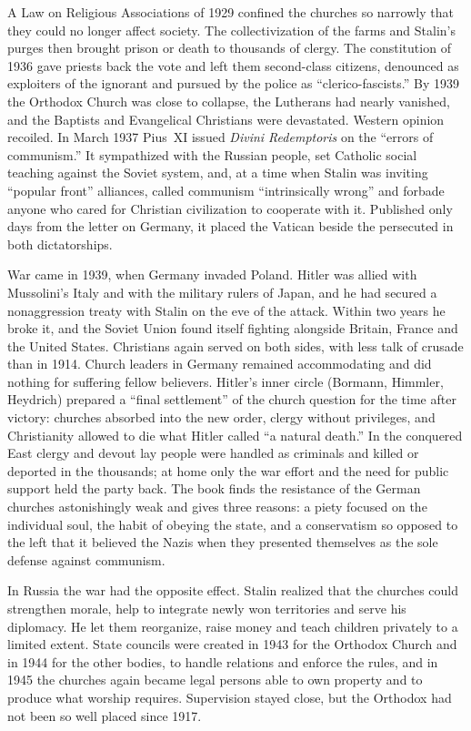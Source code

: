 A Law on Religious Associations of 1929 confined the churches so narrowly that they could no longer
affect society. The collectivization of the farms and Stalin's purges then brought prison or death to
thousands of clergy. The constitution of 1936 gave priests back the vote and left them second-class
citizens, denounced as exploiters of the ignorant and pursued by the police as ``clerico-fascists.''
By 1939 the Orthodox Church was close to collapse, the Lutherans had nearly vanished, and the
Baptists and Evangelical Christians were devastated. Western opinion recoiled. In March 1937 Pius~XI
issued \emph{Divini Redemptoris} on the ``errors of communism.'' It sympathized with the Russian
people, set Catholic social teaching against the Soviet system, and, at a time when Stalin was
inviting ``popular front'' alliances, called communism ``intrinsically wrong'' and forbade anyone who
cared for Christian civilization to cooperate with it. Published only days from the letter on
Germany, it placed the Vatican beside the persecuted in both dictatorships.

War came in 1939, when Germany invaded Poland. Hitler was allied with Mussolini's Italy and with the
military rulers of Japan, and he had secured a nonaggression treaty with Stalin on the eve of the
attack. Within two years he broke it, and the Soviet Union found itself fighting alongside Britain,
France and the United States. Christians again served on both sides, with less talk of crusade than
in 1914. Church leaders in Germany remained accommodating and did nothing for suffering fellow
believers. Hitler's inner circle (Bormann, Himmler, Heydrich) prepared a ``final settlement'' of the
church question for the time after victory: churches absorbed into the new order, clergy without
privileges, and Christianity allowed to die what Hitler called ``a natural death.'' In the conquered
East clergy and devout lay people were handled as criminals and killed or deported in the thousands;
at home only the war effort and the need for public support held the party back. The book finds the
resistance of the German churches astonishingly weak and gives three reasons: a piety focused on the
individual soul, the habit of obeying the state, and a conservatism so opposed to the left that it
believed the Nazis when they presented themselves as the sole defense against communism.

In Russia the war had the opposite effect. Stalin realized that the churches could strengthen
morale, help to integrate newly won territories and serve his diplomacy. He let them reorganize,
raise money and teach children privately to a limited extent. State councils were created in 1943 for
the Orthodox Church and in 1944 for the other bodies, to handle relations and enforce the rules, and
in 1945 the churches again became legal persons able to own property and to produce what worship
requires. Supervision stayed close, but the Orthodox had not been so well placed since 1917.

